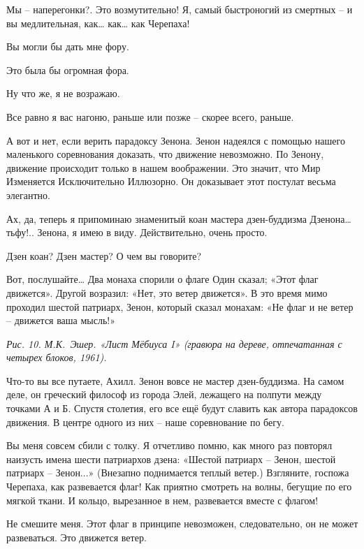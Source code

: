 \documentclass[../main.tex]{subfiles}
\begin{document}
\begin{Dialogue}
 Мы \--- наперегонки?. Это возмутительно! Я, самый быстроногий из смертных \--- и вы медлительная, как\ldots{} как\ldots{} как Черепаха!

 Вы могли бы дать мне фору.

 Это была бы огромная фора.

 Ну что же, я не возражаю.

 Все равно я вас нагоню, раньше или позже \--- скорее всего, раньше.

 А вот и нет, если верить парадоксу Зенона. Зенон надеялся с помощью нашего маленького соревнования доказать, что движение невозможно. По Зенону, движение происходит только в нашем воображении. Это значит, что Мир Изменяется Исключительно Иллюзорно. Он доказывает этот постулат весьма элегантно.

 Ах, да, теперь я припоминаю знаменитый коан мастера дзен-буддизма Дзенона\ldots{} тьфу!.. Зенона, я имею в виду. Действительно, очень просто.

 Дзен коан? Дзен мастер? О чем вы говорите?

 Вот, послушайте\ldots{} Два монаха спорили о флаге Один сказал; «Этот флаг движется». Другой возразил: «Нет, это ветер движется». В это время мимо проходил шестой патриарх, Зенон, который сказал монахам: «Не флаг и не ветер \--- движется ваша мысль!»

\emph{Рис. 10. М.К.~Эшер. «Лист Мёбиуса I» (гравюра на дереве, отпечатанная с четырех блоков, 1961).}

 Что-то вы все путаете, Ахилл. Зенон вовсе не мастер дзен-буддизма. На самом деле, он греческий философ из города Элей, лежащего на полпути между точками А и Б. Спустя столетия, его все ещё будут славить как автора парадоксов движения. В центре одного из них \--- наше соревнование по бегу.

 Вы меня совсем сбили с толку. Я отчетливо помню, как много раз повторял наизусть имена шести патриархов дзена: «Шестой патриарх \--- Зенон, шестой патриарх \--- Зенон...» (Внезапно поднимается теплый ветер.) Взгляните, госпожа Черепаха, как развевается флаг! Как приятно смотреть на волны, бегущие по его мягкой ткани. И кольцо, вырезанное в нем, развевается вместе с флагом!

 Не смешите меня. Этот флаг в принципе невозможен, следовательно, он не может развеваться. Это движется ветер.


\end{Dialogue}
\end{document}

